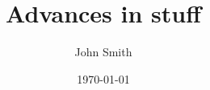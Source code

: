 
\makeatletter
{}
\makeatother

\title{Advances in stuff}
\author{John Smith}
\date{\today}

\renewcommand{\thepage}{\roman{page}}

